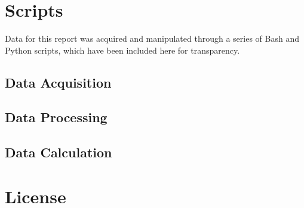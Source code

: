 \documentclass{article}
\begin{document}
\newpage
\appendix

\section{Scripts}
Data for this report was acquired and manipulated through a series of Bash and
Python scripts, which have been included here for transparency.

\subsection{Data Acquisition}
\begin{center}
	\parbox{.85\textwidth}{
	}
\end{center}

\subsection{Data Processing}
\begin{center}
	\parbox{.85\textwidth}{
	}
\end{center}

\subsection{Data Calculation}
\begin{center}
	\parbox{.85\textwidth}{
	}
\end{center}

\newpage
\section{License}

\end{document}
